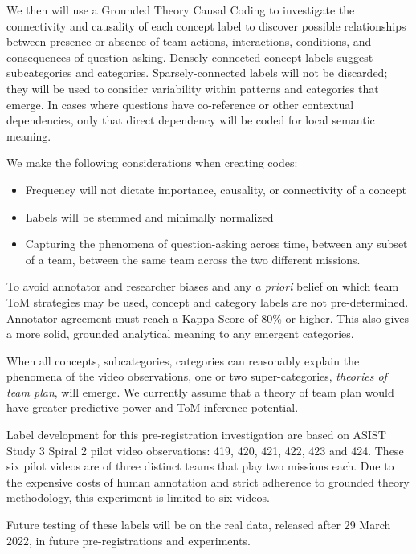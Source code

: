 We then will use a Grounded Theory Causal Coding to investigate the connectivity and causality of each concept label to discover possible relationships between presence or absence of team actions, interactions, conditions, and consequences of question-asking. Densely-connected concept labels suggest subcategories and categories. Sparsely-connected labels will not be discarded; they will be used to consider variability within patterns and categories that emerge. In cases where questions have co-reference or other contextual dependencies, only that direct dependency will be coded for local semantic meaning.

We make the following considerations when creating codes: 
\begin{itemize}
    \item Frequency will not dictate importance, causality, or connectivity of a concept
    \item Labels will be stemmed and minimally normalized 
    \item Capturing the phenomena of question-asking across time, between any subset of a team, between the same team across the two different missions. 
\end{itemize}

To avoid annotator and researcher biases and any \textit{a priori} belief on
which team ToM strategies may be used, concept and category labels are not
pre-determined. Annotator agreement must reach a Kappa Score of 80\% or higher. This also gives a more solid, grounded analytical meaning to any emergent categories. 

When all concepts, subcategories, categories can reasonably explain the phenomena of the video observations, one or two super-categories, \textit{theories of team plan}, will emerge. We currently assume that a theory of team plan would have greater predictive power and ToM inference potential. 

Label development for this pre-registration investigation are based on ASIST Study 3 Spiral 2 pilot video observations: 419, 420, 421, 422, 423 and 424. These six pilot videos are of three distinct teams that play two missions each. Due to the expensive costs of human annotation and strict adherence to grounded theory methodology, this experiment is limited to six videos. 

Future testing of these labels will be on the real data, released after 29 March 2022, in future pre-registrations and experiments. 






